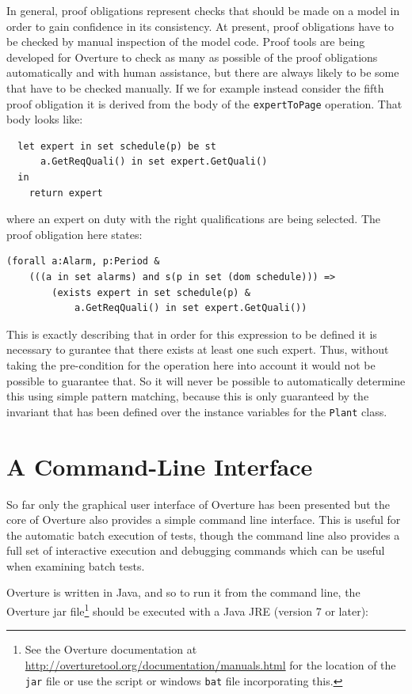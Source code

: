 In general, proof obligations represent checks that should be made on a model in order to gain confidence in its consistency. At present, proof obligations have to be checked by manual inspection of the model code. Proof tools are being developed for Overture to check as many as possible of the proof obligations automatically and with human assistance, but there are always likely to be some that have to be checked manually. If we for example instead consider the fifth proof obligation it is derived from the body of the \texttt{expertToPage} operation. That body looks like:

\begin{lstlisting}
  let expert in set schedule(p) be st
      a.GetReqQuali() in set expert.GetQuali()
  in
    return expert
\end{lstlisting}

\noindent where an expert on duty with the right qualifications are
being selected. The proof obligation here states:

\begin{lstlisting}
(forall a:Alarm, p:Period &
	(((a in set alarms) and s(p in set (dom schedule))) => 
		(exists expert in set schedule(p) &
			a.GetReqQuali() in set expert.GetQuali())
\end{lstlisting}

\noindent This is exactly describing that in order for this expression to be defined it is necessary to gurantee that there exists at least one such expert. Thus, without taking the pre-condition for the operation here into account it would not be possible to guarantee that. So it will never be possible to automatically determine this using simple pattern matching, because this is only guaranteed by the invariant that has been defined over the instance variables for the \texttt{Plant} class.
%
\section{A Command-Line Interface}\label{sec:cmdline}
So far only the graphical user interface of Overture has been presented but the core of Overture also provides a simple command line interface.  This is useful for the automatic batch execution of tests, though the command line also provides a full set of interactive execution and debugging commands which can be useful when examining batch tests. 

Overture is written in Java, and so to run it from the command line, the Overture jar file\footnote{See the Overture documentation at \url{http://overturetool.org/documentation/manuals.html} for the location of the \texttt{jar} file or use the script or windows \texttt{bat} file incorporating this.} should be executed with a Java JRE (version 7 or later):

